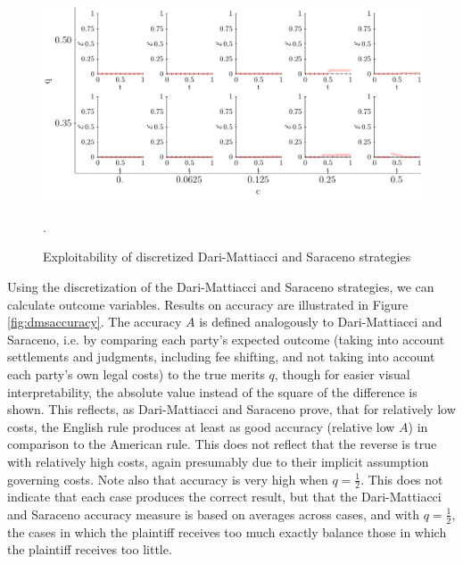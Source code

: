 \documentclass{article}
\begin{document}
\begin{figure}[h!]
\centering
\includegraphics[scale=0.60, trim={0.05in 0.15in 0in 0in}, clip]{../Figures/DMS formulas exploitability.pdf}
\vspace*{-2mm}
\caption{Exploitability of discretized Dari-Mattiacci and Saraceno strategies}. 
\label{fig:exploit}
\end{figure}

Using the discretization of the Dari-Mattiacci and Saraceno strategies, we can calculate outcome variables. Results on accuracy are illustrated in Figure \ref{fig:dmsaccuracy}. The accuracy $A$ is defined analogously to Dari-Mattiacci and Saraceno, i.e. by comparing each party's expected outcome (taking into account settlements and judgments, including fee shifting, and not taking into account each party's own legal costs) to the true merits $q$, though for easier visual interpretability, the absolute value instead of the square of the difference is shown. This reflects, as Dari-Mattiacci and Saraceno prove, that for relatively low costs, the English rule produces at least as good accuracy (relative low $A$) in comparison to the American rule. This does not reflect that the reverse is true with relatively high costs, again presumably due to their implicit assumption governing costs. Note also that accuracy is very high when $q=\frac{1}{2}$. This does not indicate that each case produces the correct result, but that the Dari-Mattiacci and Saraceno accuracy measure is based on averages across cases, and with $q=\frac{1}{2}$, the cases in which the plaintiff receives too much exactly balance those in which the plaintiff receives too little. 
\end{document}
